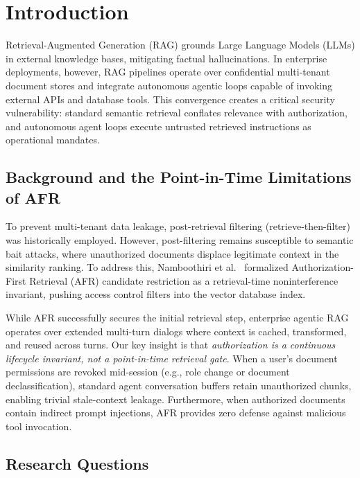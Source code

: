 \documentclass[journal,compsoc]{IEEEtran}
\begin{document}
\section{Introduction}
\label{sec:intro}

Retrieval-Augmented Generation (RAG) grounds Large Language Models (LLMs) in external knowledge bases, mitigating factual hallucinations. In enterprise deployments, however, RAG pipelines operate over confidential multi-tenant document stores and integrate autonomous agentic loops capable of invoking external APIs and database tools. This convergence creates a critical security vulnerability: standard semantic retrieval conflates relevance with authorization, and autonomous agent loops execute untrusted retrieved instructions as operational mandates.

\subsection{Background and the Point-in-Time Limitations of AFR}
\label{sec:intro:background}

To prevent multi-tenant data leakage, post-retrieval filtering (retrieve-then-filter) was historically employed. However, post-filtering remains susceptible to semantic bait attacks, where unauthorized documents displace legitimate context in the similarity ranking. To address this, Namboothiri et al.~\cite{namboothiri2024author} formalized Authorization-First Retrieval (AFR) candidate restriction as a retrieval-time noninterference invariant, pushing access control filters into the vector database index.

While AFR successfully secures the initial retrieval step, enterprise agentic RAG operates over extended multi-turn dialogs where context is cached, transformed, and reused across turns. Our key insight is that \textit{authorization is a continuous lifecycle invariant, not a point-in-time retrieval gate}. When a user's document permissions are revoked mid-session (e.g., role change or document declassification), standard agent conversation buffers retain unauthorized chunks, enabling trivial stale-context leakage. Furthermore, when authorized documents contain indirect prompt injections, AFR provides zero defense against malicious tool invocation.

\subsection{Research Questions}
\label{sec:intro:rqs}
\end{document}
